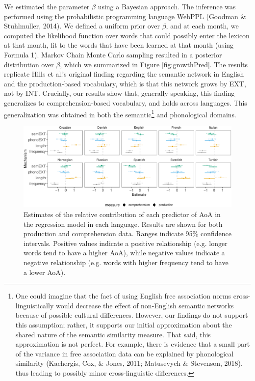 \documentclass[english,,man,floatsintext]{apa6}
\let\rmarkdownfootnote\footnote%
\def\footnote{\protect\rmarkdownfootnote}
\begin{document}
We estimated the parameter \(\beta\) using a Bayesian approach. The inference was performed using the probabilistic programming language WebPPL (Goodman \& Stuhlmuller, 2014). We defined a uniform prior over \(\beta\), and at each month, we computed the likelihood function over words that could possibly enter the lexicon at that month, fit to the words that have been learned at that month (using Formula 1). Markov Chain Monte Carlo sampling resulted in a posterior distribution over \(\beta\), which we summarized in Figure \ref{fig:growthPred}. The results replicate Hills et al.'s original finding regarding the semantic network in English and the production-based vocabulary, which is that this network grows by EXT, not by INT. Crucially, our results show that, generally speaking, this finding generalizes to comprehension-based vocabulary, and holds across languages. This generalization was obtained in both the semantic\footnote{One could imagine that the fact of using English free association norms cross-linguistically would decrease the effect of non-English semantic networks because of possible cultural differences. However, our findings do not support this assumption; rather, it supports our initial approximation about the shared nature of the semantic similarity measure. That said, this approximation is not perfect. For example, there is evidence that a small part of the variance in free association data can be explained by phonological similarity (Kachergis, Cox, \& Jones, 2011; Matusevych \& Stevenson, 2018), thus leading to possibly minor cross-linguistic differences.} and phonological domains.

\begin{figure}[!h]
\includegraphics[width=\textwidth]{ms_files/figure-latex/staticPred-1} \caption{Estimates of the relative contribution of each predictor of AoA in the regression model in each language. Results are shown for both production and comprehension data. Ranges indicate 95\% confidence intervals. Positive values indicate a positive relationship (e.g. longer words tend to have a higher AoA), while negative values indicate a negative relationship (e.g. words with higher frequency tend to have a lower AoA).}\label{fig:staticPred}
\end{figure}
\end{document}
